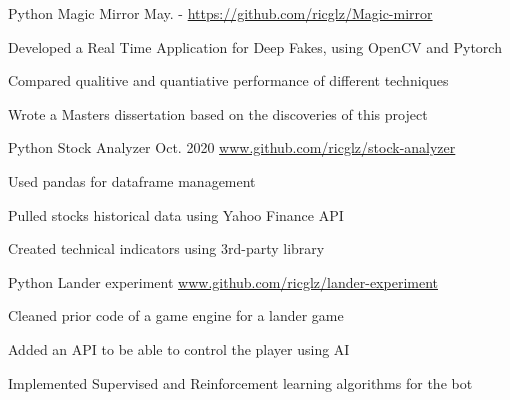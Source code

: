 \begin{cventries}
  \cventry
    {Python}
    {Magic Mirror} %
    {May. - } %
    {\url{https://github.com/ricglz/Magic-mirror}} %
    {
      \begin{cvitems} %
        \item {Developed a Real Time Application for Deep Fakes, using OpenCV and Pytorch}
        \item {Compared qualitive and quantiative performance of different techniques}
        \item {Wrote a Masters dissertation based on the discoveries of this project}
      \end{cvitems}
    }
  \cventry
    {Python}
    {Stock Analyzer} %
    {Oct. 2020} %
    {\url{www.github.com/ricglz/stock-analyzer}} %
    {
      \begin{cvitems} %
        \item {Used pandas for dataframe management}
        \item {Pulled stocks historical data using Yahoo Finance API}
        \item {Created technical indicators using 3rd-party library}
      \end{cvitems}
    }

  \cventry
    {Python}
    {Lander experiment}
    {}
    {\url{www.github.com/ricglz/lander-experiment}}
    {
      \begin{cvitems}
        \item {Cleaned prior code of a game engine for a lander game}
        \item {Added an API to be able to control the player using AI}
        \item {Implemented Supervised and Reinforcement learning algorithms for the bot}
      \end{cvitems}
    }



\end{cventries}
